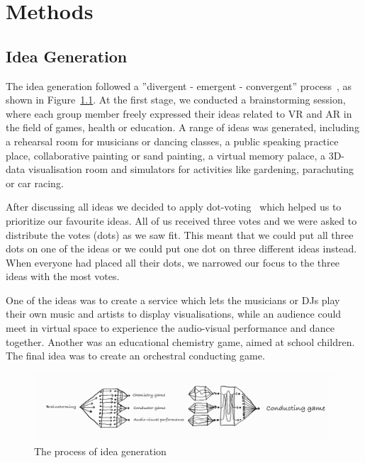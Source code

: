 \chapter{Methods} \label{chap:methods}
\section{Idea Generation} 
The idea generation followed a ''divergent - emergent - convergent'' process~\cite{gameBook}, as shown in Figure~\ref{fig:ideaGeneration}. At the first stage, we conducted a brainstorming session, where each group member freely expressed their ideas related to VR and AR in the field of games, health or education. A range of ideas was generated, including a rehearsal room for musicians or dancing classes, a public speaking practice place, collaborative painting or sand painting, a virtual memory palace, a 3D-data visualisation room and simulators for activities like gardening, parachuting or car racing. 

After discussing all ideas we decided to apply dot-voting~\cite{gameBook} which helped us to prioritize our favourite ideas. All of us received three votes and we were asked to distribute the votes (dots) as we saw fit. This meant that we could put all three dots on one of the ideas or we could put one dot on three different ideas instead. When everyone had placed all their dots, we narrowed our focus to the three ideas with the most votes. 

One of the ideas was to create a service which lets the musicians or DJs play their own music and artists to display visualisations, while an audience could meet in virtual space to experience the audio-visual performance and dance together. Another was an educational chemistry game, aimed at school children. The final idea was to create an orchestral conducting game.

\begin{figure}[tbph]
    \centering
    \includegraphics[width=1.0\textwidth]{images/ideaGenerationProcess.png}
    \caption[Idea Generation Process]{The process of idea generation~\cite{gameBook}}
    \label{fig:ideaGeneration}
\end{figure}

